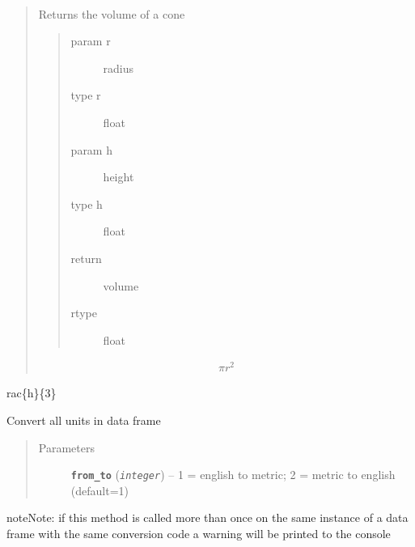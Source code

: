 \documentclass[letterpaper,10pt,english]{sphinxmanual}
\begin{document}
\begin{fulllineitems}
\begin{fulllineitems}
\label{fuels_FuelCalc:fuels.FuelCalc.cone_volume}~\begin{quote}

Returns the volume of a cone
\begin{quote}\begin{description}
\item[{param r}] \leavevmode
radius

\item[{type r}] \leavevmode
float

\item[{param h}] \leavevmode
height

\item[{type h}] \leavevmode
float

\item[{return}] \leavevmode
volume

\item[{rtype}] \leavevmode
float

\end{description}\end{quote}
\begin{equation*}
\begin{split}\pi r^2 \end{split}
\end{equation*}\end{quote}

rac\{h\}\{3\}

\end{fulllineitems}


\begin{fulllineitems}
\label{fuels_FuelCalc:fuels.FuelCalc.convert_units}
Convert all units in data frame
\begin{quote}\begin{description}
\item[{Parameters}] \leavevmode
\textbf{\texttt{from\_to}} (\emph{\texttt{integer}}) -- 1 = english to metric; 2 = metric to english (default=1)

\end{description}\end{quote}

\begin{notice}{note}{Note:}
if this method is called more than once on the same instance
of a data frame with the same conversion code a warning will
be printed to the console
\end{notice}


\end{fulllineitems}
\end{fulllineitems}
\end{document}

